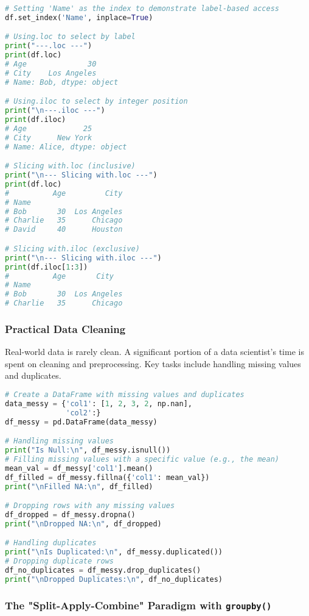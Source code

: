 \documentclass[11pt,a4paper]{article}
\begin{document}
\begin{lstlisting}[language=Python]
# Setting 'Name' as the index to demonstrate label-based access
df.set_index('Name', inplace=True)

# Using.loc to select by label
print("---.loc ---")
print(df.loc)
# Age              30
# City    Los Angeles
# Name: Bob, dtype: object

# Using.iloc to select by integer position
print("\n---.iloc ---")
print(df.iloc)
# Age             25
# City      New York
# Name: Alice, dtype: object

# Slicing with.loc (inclusive)
print("\n--- Slicing with.loc ---")
print(df.loc)
#          Age         City
# Name
# Bob       30  Los Angeles
# Charlie   35      Chicago
# David     40      Houston

# Slicing with.iloc (exclusive)
print("\n--- Slicing with.iloc ---")
print(df.iloc[1:3])
#          Age       City
# Name
# Bob       30  Los Angeles
# Charlie   35      Chicago
\end{lstlisting}

\subsubsection{Practical Data Cleaning}

Real-world data is rarely clean. A significant portion of a data scientist's time is spent on cleaning and preprocessing. Key tasks include handling missing values and duplicates.

\begin{lstlisting}[language=Python]
# Create a DataFrame with missing values and duplicates
data_messy = {'col1': [1, 2, 3, 2, np.nan],
              'col2':}
df_messy = pd.DataFrame(data_messy)

# Handling missing values
print("Is Null:\n", df_messy.isnull())
# Filling missing values with a specific value (e.g., the mean)
mean_val = df_messy['col1'].mean()
df_filled = df_messy.fillna({'col1': mean_val})
print("\nFilled NA:\n", df_filled)

# Dropping rows with any missing values
df_dropped = df_messy.dropna()
print("\nDropped NA:\n", df_dropped)

# Handling duplicates
print("\nIs Duplicated:\n", df_messy.duplicated())
# Dropping duplicate rows
df_no_duplicates = df_messy.drop_duplicates()
print("\nDropped Duplicates:\n", df_no_duplicates)
\end{lstlisting}

\subsubsection{The "Split-Apply-Combine" Paradigm with \texttt{groupby()}}
\end{document}
